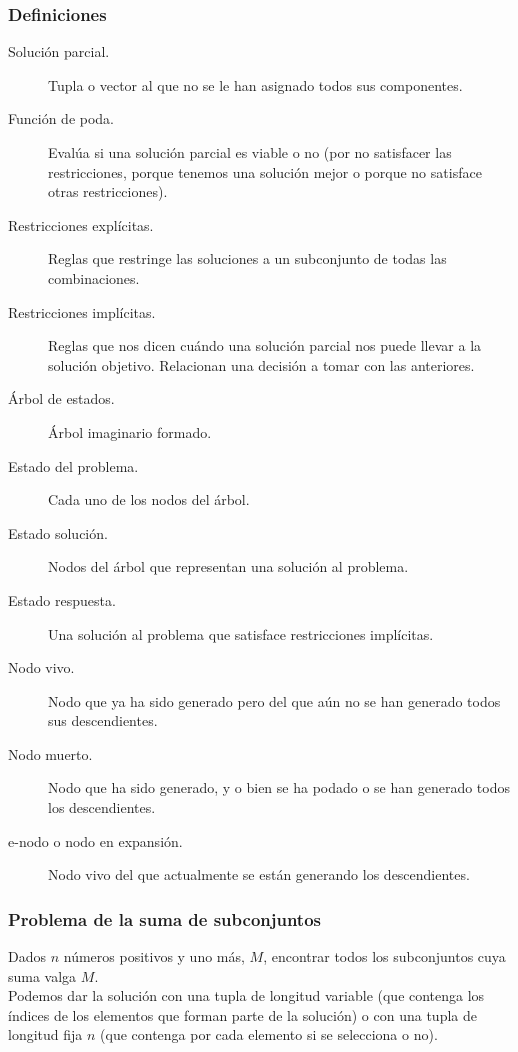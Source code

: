 \subsubsection{Definiciones}
\begin{description}
    \item [Solución parcial.] Tupla o vector al que no se le han asignado todos sus componentes.
    \item [Función de poda.] Evalúa si una solución parcial es viable o no (por no satisfacer las restricciones, porque tenemos una solución mejor o porque no satisface otras restricciones).
    \item [Restricciones explícitas.] Reglas que restringe las soluciones a un subconjunto de todas las combinaciones.
    \item [Restricciones implícitas.] Reglas que nos dicen cuándo una solución parcial nos puede llevar a la solución objetivo. Relacionan una decisión a tomar con las anteriores.
    \item [Árbol de estados.] Árbol imaginario formado.
    \item [Estado del problema.] Cada uno de los nodos del árbol.
    \item [Estado solución.] Nodos del árbol que representan una solución al problema.
    \item [Estado respuesta.] Una solución al problema que satisface restricciones implícitas.
    \item [Nodo vivo.] Nodo que ya ha sido generado pero del que aún no se han generado todos sus descendientes.
    \item [Nodo muerto.] Nodo que ha sido generado, y o bien se ha podado o se han generado todos los descendientes.
    \item [e-nodo o nodo en expansión.] Nodo vivo del que actualmente se están generando los descendientes.
\end{description}

\subsubsection{Problema de la suma de subconjuntos}
Dados $n$ números positivos y uno más, $M$, encontrar todos los subconjuntos cuya suma valga $M$.\\

Podemos dar la solución con una tupla de longitud variable (que contenga los índices de los elementos que forman parte de la solución) o con una tupla de longitud fija $n$ (que contenga por cada elemento si se selecciona o no).

